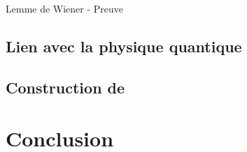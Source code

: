 \documentclass[12pt]{beamer}
\begin{document}
\begin{frame}{Lemme de Wiener - Preuve}

\end{frame}

\subsection{Lien avec la physique quantique}

\subsection{Construction de }

\section{Conclusion}

\begin{frame}


\end{frame}
\end{document}
